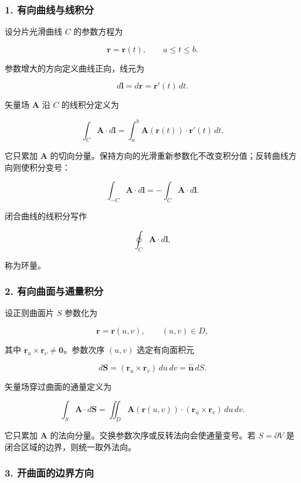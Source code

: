 \subsubsection{1.
有向曲线与线积分}\label{m1:ux6709ux5411ux66f2ux7ebfux4e0eux7ebfux79efux5206}

设分片光滑曲线 \(C\) 的参数方程为

\[
\mathbf r=\mathbf r(t),
\qquad
a\le t\le b.
\]

参数增大的方向定义曲线正向，线元为

\[
d\mathbf l=d\mathbf r
=\mathbf r'(t)\,dt.
\]

矢量场 \(\mathbf A\) 沿 \(C\) 的线积分定义为

\[
\boxed{
\int_C\mathbf A\cdot d\mathbf l
=
\int_a^b
\mathbf A(\mathbf r(t))\cdot\mathbf r'(t)\,dt
}.
\]

它只累加 \(\mathbf A\)
的切向分量。保持方向的光滑重新参数化不改变积分值；反转曲线方向则使积分变号：

\[
\int_{-C}\mathbf A\cdot d\mathbf l
=
-\int_C\mathbf A\cdot d\mathbf l.
\]

闭合曲线的线积分写作

\[
\oint_C\mathbf A\cdot d\mathbf l,
\]

称为环量。

\subsubsection{2.
有向曲面与通量积分}\label{m1:ux6709ux5411ux66f2ux9762ux4e0eux901aux91cfux79efux5206}

设正则曲面片 \(S\) 参数化为

\[
\mathbf r=\mathbf r(u,v),
\qquad
(u,v)\in D,
\]

其中 \(\mathbf r_u\times\mathbf r_v\neq\mathbf0\)。参数次序 \((u,v)\)
选定有向面积元

\[
d\mathbf S
=
(\mathbf r_u\times\mathbf r_v)\,du\,dv
=
\hat{\mathbf n}\,dS.
\]

矢量场穿过曲面的通量定义为

\[
\boxed{
\int_S\mathbf A\cdot d\mathbf S
=
\iint_D
\mathbf A(\mathbf r(u,v))
\cdot
(\mathbf r_u\times\mathbf r_v)\,du\,dv
}.
\]

它只累加 \(\mathbf A\)
的法向分量。交换参数次序或反转法向会使通量变号。若 \(S=\partial V\)
是闭合区域的边界，则统一取外法向。

\subsubsection{3.
开曲面的边界方向}\label{m1:ux5f00ux66f2ux9762ux7684ux8fb9ux754cux65b9ux5411}

